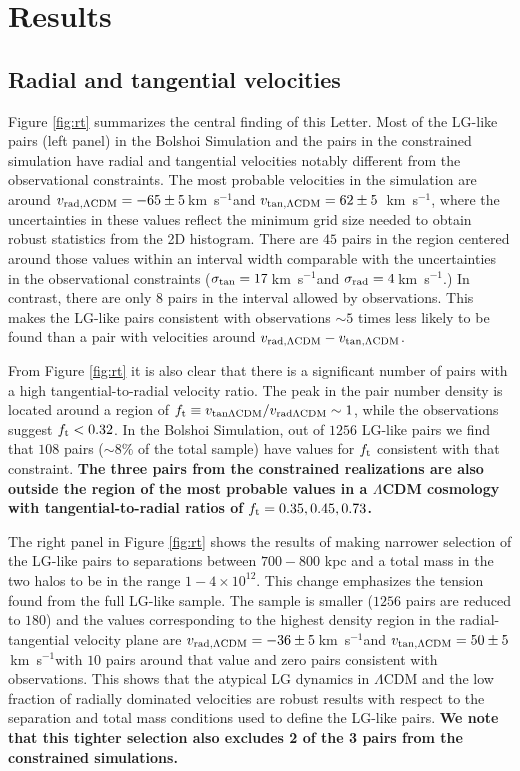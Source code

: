 \documentclass{emulateapj}
\newcommand{\kms}{\,km~s$^{-1}$}
\newcommand{\Msun}{{\ifmmode{{\rm {M_{\odot}}}}\else{${\rm{M_{\odot}}}$}\fi}}
\begin{document}
\section{Results}
\label{sec:results}




\subsection{Radial and tangential velocities}

Figure \ref{fig:rt} summarizes the central finding of this Letter. Most of the LG-like pairs (left panel) in the Bolshoi Simulation and the pairs in the constrained simulation have radial and tangential velocities notably different from the observational constraints.  The most probable velocities in the simulation are around $v_{\rm rad,\Lambda CDM} = -65\pm5$\kms and $v_{\rm tan,\Lambda CDM} = 62\pm5$ \kms, where the uncertainties in these values reflect the minimum grid size needed to obtain robust statistics from the 2D histogram. There are $45$ pairs in the region centered around those values within an interval width comparable with the uncertainties in the observational constraints ($\sigma_{\rm tan}=17$\kms and $\sigma_{\rm rad}=4$\kms.) In contrast, there are only $8$ pairs in the interval allowed by observations. This makes the LG-like pairs consistent with observations $\sim5$ times less likely to be found than a pair with velocities around $v_{\rm rad,\Lambda CDM}-v_{\rm tan,\Lambda CDM}$.

From Figure \ref{fig:rt} it is also clear that there is a significant number of pairs with a high tangential-to-radial velocity ratio. The peak in the pair number density is located around a region of $f_{\rm t}\equiv v_{\rm tan \Lambda CDM}/v_{\rm rad \Lambda CDM}\sim 1$, while the observations suggest $f_{\rm t}<0.32$. In the Bolshoi Simulation, out of $1256$ LG-like pairs we find that $108$ pairs ($\sim 8\%$ of the total sample) have values for $f_{\rm t}$ consistent with that constraint. {\bf The three pairs from the constrained realizations are also outside the region of the most probable values in a $\Lambda$CDM cosmology with tangential-to-radial ratios of $f_{\rm t}= 0.35, 0.45, 0.73$.}

The right panel in Figure \ref{fig:rt} shows the results of making narrower selection of the LG-like pairs to separations between $700-800$ kpc and a total mass in the two halos to be in the range $1-4 \times 10^{12}$\Msun. This change emphasizes the tension found from the full LG-like sample. The sample is smaller ($1256$ pairs are reduced to $180$) and the values corresponding to the highest density region in the radial-tangential velocity plane are  $v_{\rm rad,\Lambda CDM} = -36\pm 5$\kms and $v_{\rm tan,\Lambda CDM} = 50\pm5$\kms with $10$ pairs around that value and zero pairs consistent with observations. This shows that the atypical LG dynamics in $\Lambda$CDM and the low fraction of radially dominated velocities are robust results with respect to the separation and total mass conditions used to define the LG-like pairs. {\bf We note that this tighter selection also excludes 2 of the 3 pairs from the constrained simulations.}
\end{document}
